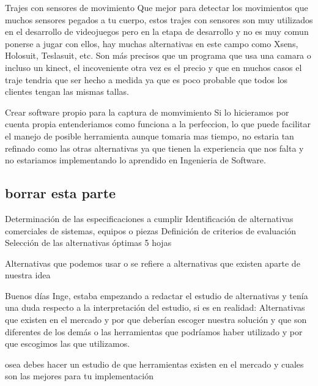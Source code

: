 Trajes con sensores de movimiento
Que mejor para detectar los movimientos que muchos sensores pegados a tu cuerpo, estos trajes con sensores son muy utilizados en el desarrollo de videojuegos pero en la etapa de desarrollo y no es muy comun ponerse a jugar con ellos, hay muchas alternativas en este campo como Xsens, Holosuit, Teslasuit, etc. Son más precisos que un programa que usa una camara o incluso un kinect, el incoveniente otra vez es el precio y que en muchos casos el traje tendria que ser hecho a medida ya que es poco probable que todos los clientes tengan las mismas tallas.

Crear software propio para la captura de momvimiento
Si lo hicieramos por cuenta propia entenderiamos como funciona a la perfeccion, lo que puede facilitar el manejo de posible herramienta aunque tomaria mas tiempo, no estaria tan refinado como las otras alternativas ya que tienen la experiencia que nos falta y no estariamos implementando lo aprendido en Ingenieria de Software.











\subsection{borrar esta parte}
Determinación de las especificaciones a cumplir
Identificación de alternativas comerciales de
sistemas, equipos o piezas
Definición de criterios de evaluación
Selección de las alternativas óptimas
5 hojas


Alternativas que podemos usar o se refiere a alternativas que existen aparte de nuestra idea

Buenos días Inge, estaba empezando a redactar el estudio de alternativas y tenía una duda respecto a la interpretación del estudio, si es en realidad:
Alternativas que existen en el mercado y por que deberían escoger nuestra solución y que son diferentes de los demás o las herramientas que podríamos haber utilizado y por que escogimos las que utilizamos.


osea debes hacer un estudio de que herramientas existen en el mercado y cuales son las mejores para tu implementación